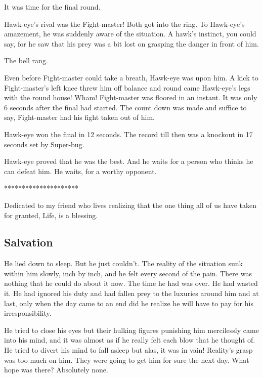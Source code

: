 \documentclass[twoside,11pt,titlepage]{article}
\begin{document}
It was time for the final round.

Hawk-eye's rival was the Fight-master! Both got into the ring. To Hawk-eye's amazement, he was suddenly aware of the situation. A hawk's instinct, you could say, for he saw that his prey was a bit lost on grasping the danger in front of him.

The bell rang.

Even before Fight-master could take a breath, Hawk-eye was upon him. A kick to Fight-master's left knee threw him off balance and round came Hawk-eye's legs with the round house! Wham! Fight-master was floored in an instant. It was only 6 seconds after the final had started. The count down was made and suffice to say, Fight-master had his fight taken out of him.

Hawk-eye won the final in 12 seconds. The record till then was a knockout in 17 seconds set by Super-bug.

Hawk-eye proved that he was the best. And he waits for a person who thinks he can defeat him. He waits, for a worthy opponent.

\bigskip
\begin{center}
*********************
\end{center}

Dedicated to my friend who lives realizing that the one thing all of us have taken for granted, Life, is a blessing.

\newpage

\begin{center}
  \section{Salvation}
\end{center}
\bigskip
\bigskip
\bigskip

He lied down to sleep. But he just couldn't. The reality of the situation sunk within him slowly, inch by inch, and he felt every second of the pain. There was nothing that he could do about it now. The time he had was over. He had wasted it. He had ignored his duty and had fallen prey to the luxuries around him and at last, only when the day came to an end did he realize he will have to pay for his irresponsibility.

He tried to close his eyes but their hulking figures punishing him mercilessly came into his mind, and it was almost as if he really felt each blow that he thought of. He tried to divert his mind to fall asleep but alas, it was in vain! Reality's grasp was too much on him. They were going to get him for sure the next day. What hope was there? Absolutely none.
\end{document}
